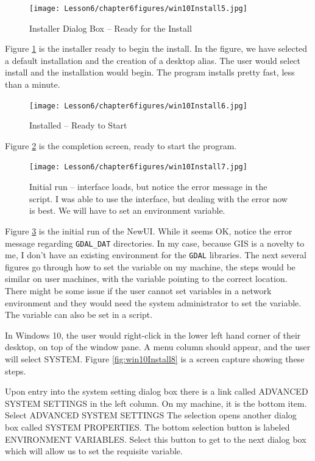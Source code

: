 \begin{figure}[h!] %
   \centering
   \texttt{[image: Lesson6/chapter6figures/win10Install5.jpg]} 
   \caption{Installer Dialog Box -- Ready for the Install}
   \label{fig:win10Install5}
\end{figure}

Figure \ref{fig:win10Install5} is the installer ready to begin the install.  In the figure, we have selected a default installation and the creation of a desktop alias.  The user would select install and the installation would begin.   The program installs pretty fast, less than a minute.

\begin{figure}[h!] %
   \centering
   \texttt{[image: Lesson6/chapter6figures/win10Install6.jpg]} 
   \caption{Installed -- Ready to Start}
   \label{fig:win10Install6}
\end{figure}
Figure \ref{fig:win10Install6} is the completion screen, ready to start the program.
\clearpage
\begin{figure}[h!] %
   \centering
   \texttt{[image: Lesson6/chapter6figures/win10Install7.jpg]} 
   \caption{Initial run -- interface loads, but notice the error message in the script.  I was able to use the interface, but dealing with the error now is best.  We will have to set an environment variable.}
   \label{fig:win10Install7}
\end{figure}

Figure \ref{fig:win10Install7} is the initial run of the NewUI.  While it seems OK, notice the error message regarding \texttt{GDAL\_DAT} directories.  In my case, because GIS is a novelty to me, I don't have an existing environment for the \texttt{GDAL} libraries.  The next several figures go through how to set the variable on my machine, the steps would be similar on user machines, with the variable pointing to the correct location.  There might be some issue if the user cannot set variables in a network environment and they would need the system administrator to set the variable.
The variable can also be set in a script.

In Windows 10, the user would right-click in the lower left hand corner of their desktop, on top of the window pane.
A menu column should appear, and the user will select SYSTEM.
Figure \ref{fig:win10Install8} is a screen capture showing these steps.

Upon entry into the system setting dialog box there is a link called ADVANCED SYSTEM SETTINGS in the left column. 
On my machine, it is the bottom item.
Select ADVANCED SYSTEM SETTINGS
The selection opens another dialog box called SYSTEM PROPERTIES.  
The bottom selection button is labeled ENVIRONMENT VARIABLES.
Select this button to get to the next dialog box which will allow us to set the requisite variable.

